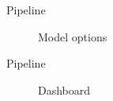 \begin{frame}{Pipeline}

	\begin{figure}[h!]\centering
	\caption{Model options}\label{Model options}
\end{figure}

\end{frame}
\begin{frame}{Pipeline}

  \begin{figure}[h!]\centering
  \caption{Dashboard}\label{Dashboard}
  \end{figure}

\end{frame}
